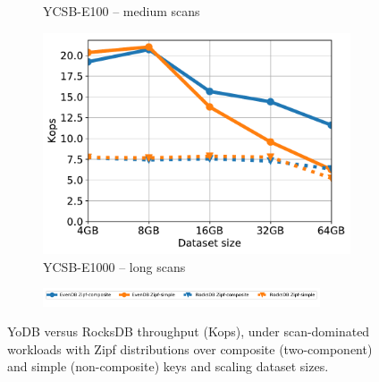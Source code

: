 \documentclass[letterpaper,twocolumn,10pt]{article}
\newcommand{\sys}{YoDB}
\begin{document}
{\begin{figure}[tb]
\begin{subfigure}{0.33\linewidth}
\caption{YCSB-E100 -- medium scans}
\label{fig:throughput:e100}
\end{subfigure}
\begin{subfigure}{0.33\linewidth}
\includegraphics[width=\textwidth]{figs/complementary/Workload_E+_line.pdf}
\caption{YCSB-E1000 -- long scans}
\label{fig:throughput:e1000}
\end{subfigure}
\begin{subfigure}{\linewidth}
\centerline{
\includegraphics[width=0.9\textwidth]{figs/legend.pdf}
\vspace{-5mm}
}
\end{subfigure}
\caption{
{\sys\/ versus RocksDB throughput (Kops), under scan-dominated workloads with Zipf distributions over composite (two-component) and
simple (non-composite) keys and scaling dataset sizes.}
}
\label{fig:scans}
\end{figure}
}
\end{document}
